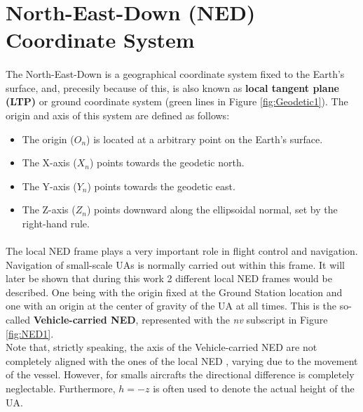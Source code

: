 \section{North-East-Down (NED) Coordinate System}\label{sec:ned}

\paragraph{} The North-East-Down is a geographical coordinate system fixed to the Earth's surface, and, precesily because of this, is also known as \textbf{local tangent plane (LTP)} or ground coordinate system (green lines in Figure \ref{fig:Geodetic1}). The origin and axis of this system are defined as follows: 
\begin{itemize}
\item{The origin (\textbf{$O_{n}$}) is located at a arbitrary point on the Earth's surface.}
\item{The X-axis (\textbf{$X_{n}$}) points towards the geodetic north.}
\item{The Y-axis (\textbf{$Y_{n}$}) points towards the geodetic east.}
\item{The Z-axis (\textbf{$Z_{n}$}) points downward along the ellipsoidal normal, set by the right-hand rule.}
\end{itemize}

\paragraph{} The local NED frame plays a very important role in flight control and navigation.
Navigation of small-scale UAs is normally carried out within this frame. It will later be shown that during this work 2 different local NED frames would be described. One being with the origin fixed at the Ground Station location and one with an origin at the center of gravity of the UA at all times. This is the so-called \textbf{Vehicle-carried NED}, represented with the \textit{nv} subscript in Figure \ref{fig:NED1}.\\
Note that, strictly speaking, the axis of the Vehicle-carried NED are not completely aligned with the ones of the local NED , varying due to the movement of the vessel. However, for smalls aircrafts the directional difference is completely neglectable. Furthermore, $h = -z$ is often used to denote the actual height of the UA.

